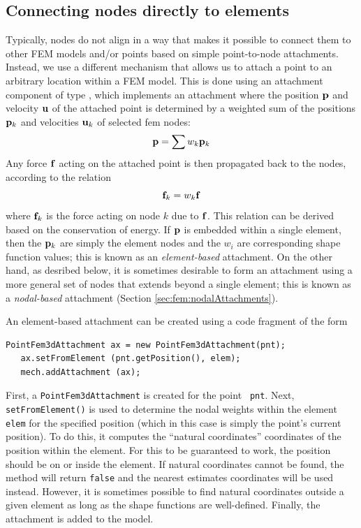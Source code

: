 \subsection{Connecting nodes directly to elements}

Typically, nodes do not align in a way that makes it
possible to connect them to other FEM models and/or points based on
simple point-to-node attachments.  Instead, we use a different
mechanism that allows us to attach a point to an arbitrary location
within a FEM model. This is done using an attachment component of
type
, which
implements an attachment where the position ${\bf p}$ and velocity ${\bf u}$ of the
attached point is determined by a weighted sum of the positions ${\bf p}_k$ 
and velocities ${\bf u}_k$ of selected fem nodes:
%
\begin{equation}
{\bf p} = \sum w_k {\bf p}_k
\label{pointFemAttachment:eqn}
\end{equation}
%
Any force ${\bf f}$ acting on the attached point is then propagated back
to the nodes, according to the relation
%
\begin{equation}
{\bf f}_k = w_k {\bf f}
\label{pointFemForces:eqn}
\end{equation}
%
where ${\bf f}_k$ is the force acting on node $k$ due to ${\bf f}$.  This
relation can be derived based on the conservation of energy.
If ${\bf p}$ is embedded within a single element, then the ${\bf p}_k$ are
simply the element nodes and the $w_i$ are corresponding shape
function values; this is known as an {\it element-based} attachment.
On the other hand, as desribed below, it is sometimes desirable to
form an attachment using a more general set of nodes that extends
beyond a single element; this is known as a {\it nodal-based}
attachment (Section \ref{sec:fem:nodalAttachments}).

An element-based attachment can be created using a code fragment
of the form
%
\begin{lstlisting}[]
   PointFem3dAttachment ax = new PointFem3dAttachment(pnt);
   ax.setFromElement (pnt.getPosition(), elem);
   mech.addAttachment (ax);
\end{lstlisting}
%
First, a {\tt PointFem3dAttachment} is created for the point {\tt
pnt}. Next, {\tt setFromElement()} is used to determine the nodal
weights within the element {\tt elem} for the specified position
(which in this case is simply the point's current position).  To do
this, it computes the ``natural coordinates'' coordinates of the
position within the element. For this to be guaranteed to work, the
position should be on or inside the element. If natural coordinates
cannot be found, the method will return {\tt false} and the nearest
estimates coordinates will be used instead. However, it is
sometimes possible to find natural coordinates outside a given element
as long as the shape functions are well-defined. Finally, the
attachment is added to the model.

